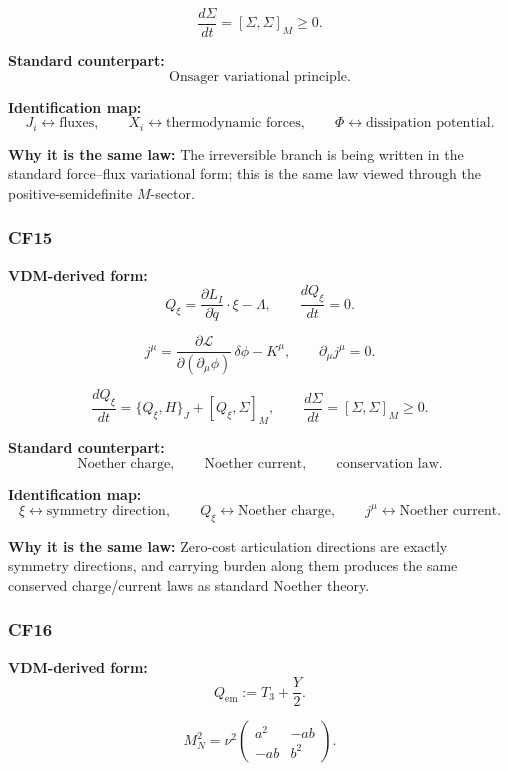 \documentclass[11pt]{article}
\theoremstyle{definition}
\theoremstyle{plain}
\theoremstyle{remark}
\begin{document}
\[
\frac{d\Sigma}{dt}=[\Sigma,\Sigma]_M \ge 0.
\]

\textbf{Standard counterpart:}
\[
\text{Onsager variational principle}.
\]

\textbf{Identification map:}
\[
J_i \leftrightarrow \text{fluxes},
\qquad
X_i \leftrightarrow \text{thermodynamic forces},
\qquad
\Phi \leftrightarrow \text{dissipation potential}.
\]

\textbf{Why it is the same law:} The irreversible branch is being written in
the standard force--flux variational form; this is the same law viewed through
the positive-semidefinite \(M\)-sector.


\subsubsection*{CF15}
\textbf{VDM-derived form:}
\[
Q_\xi
=
\frac{\partial L_I}{\partial \dot q}\cdot \xi - \Lambda,
\qquad
\frac{dQ_\xi}{dt}=0.
\]

\[
j^\mu
=
\frac{\partial \mathcal L}{\partial(\partial_\mu\phi)}\,\delta\phi
-
K^\mu,
\qquad
\partial_\mu j^\mu = 0.
\]

\[
\frac{dQ_\xi}{dt}
=
\{Q_\xi,H\}_J + [Q_\xi,\Sigma]_M,
\qquad
\frac{d\Sigma}{dt}=[\Sigma,\Sigma]_M \ge 0.
\]

\textbf{Standard counterpart:}
\[
\text{Noether charge},
\qquad
\text{Noether current},
\qquad
\text{conservation law}.
\]

\textbf{Identification map:}
\[
\xi \leftrightarrow \text{symmetry direction},
\qquad
Q_\xi \leftrightarrow \text{Noether charge},
\qquad
j^\mu \leftrightarrow \text{Noether current}.
\]

\textbf{Why it is the same law:} Zero-cost articulation directions are exactly
symmetry directions, and carrying burden along them produces the same conserved
charge/current laws as standard Noether theory.


\subsubsection*{CF16}
\textbf{VDM-derived form:}
\[
Q_{\mathrm{em}} := T_3 + \frac{Y}{2}.
\]

\[
M_N^2
=
\nu^2
\begin{pmatrix}
a^2 & -ab\\
-ab & b^2
\end{pmatrix}.
\]
\end{document}
